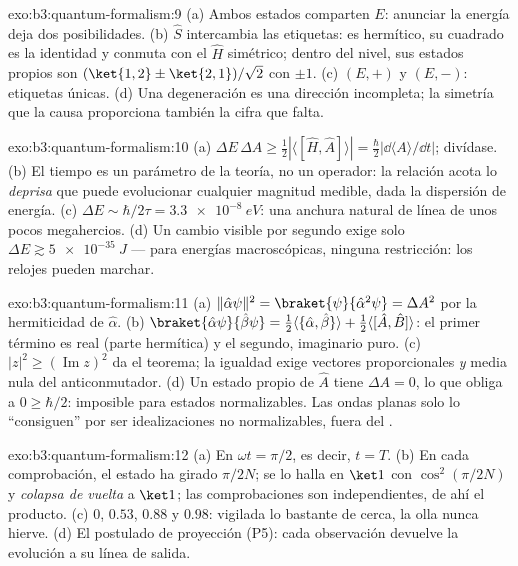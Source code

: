 \begin{solution}{exo:b3:quantum-formalism:9}
(a) Ambos estados comparten $E$: anunciar la energía deja dos
posibilidades. (b) $\hat S$ intercambia las etiquetas: es hermítico, su
cuadrado es la identidad y conmuta con el $\hat H$ simétrico; dentro del
nivel, sus estados propios son $(\ket{1,2} \pm \ket{2,1})/\sqrt2$ con
 $\pm1$. (c) $(E, +)$ y $(E, -)$: etiquetas únicas. (d) Una
degeneración es una dirección incompleta; la simetría que la causa
proporciona también la cifra que falta.
\end{solution}

\begin{solution}{exo:b3:quantum-formalism:10}
(a) $\Delta E\,\Delta A \ge \tfrac12|\langle[\hat H, \hat
A]\rangle| = \tfrac\hbar2|\dd\langle A\rangle/\dd t|$; divídase. (b)
El tiempo es un parámetro de la teoría, no un operador: la relación
acota lo \emph{deprisa} que puede evolucionar cualquier magnitud medible,
dada la dispersión de energía. (c) $\Delta E \sim \hbar/2\tau = \qty{3.3e-8}{eV}$:
una anchura natural de línea de unos pocos megahercios. (d) Un cambio
visible por segundo exige solo $\Delta E \gtrsim \qty{5e-35}{J}$ --- para
energías macroscópicas, ninguna restricción: los relojes pueden marchar.
\end{solution}

\begin{solution}{exo:b3:quantum-formalism:11}
(a) $\|\hat\alpha\psi\|^2 = \braket{\psi}{\hat\alpha^2\psi} =
\Delta A^2$ por la hermiticidad de $\hat\alpha$. (b) $\braket{\hat\alpha
\psi}{\hat\beta\psi} = \tfrac12\langle\{\hat\alpha,
\hat\beta\}\rangle + \tfrac12\langle[\hat A, \hat B]\rangle$: el
primer término es real (parte hermítica) y el segundo, imaginario puro.
(c) $|z|^2 \ge (\operatorname{Im}z)^2$ da el teorema; la igualdad
exige vectores proporcionales \emph{y} media nula del anticonmutador.
(d) Un estado propio de $\hat A$ tiene $\Delta A = 0$, lo que obliga a
$0 \ge \hbar/2$: imposible para estados normalizables. Las ondas planas
solo lo ``consiguen'' por ser idealizaciones no normalizables, fuera del
.
\end{solution}

\begin{solution}{exo:b3:quantum-formalism:12}
(a) En $\omega t = \pi/2$, es decir, $t = T$. (b) En cada comprobación, el
estado ha girado $\pi/2N$; se lo halla en $\ket1$ con
$\cos^2(\pi/2N)$ y \emph{colapsa de vuelta} a $\ket1$; las comprobaciones
son independientes, de ahí el producto. (c) $0$, $0.53$, $0.88$ y $0.98$:
vigilada lo bastante de cerca, la olla nunca hierve. (d) El postulado de
proyección (P5): cada observación devuelve la evolución a su línea de
salida.
\end{solution}

